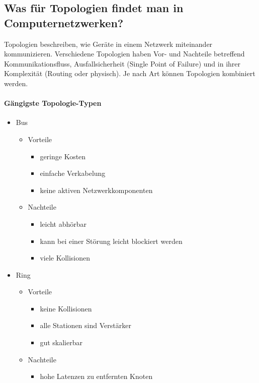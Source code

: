 \subsection*{Was für Topologien findet man in Computernetzwerken?}\label{sub:Topologies}
Topologien beschreiben, wie Geräte in einem Netzwerk miteinander kommunizieren. Verschiedene Topologien haben Vor- und Nachteile betreffend Kommunikationsfluss, Ausfallsicherheit (Single Point of Failure) und in ihrer Komplexität (Routing oder physisch). Je nach Art können Topologien kombiniert werden.

\paragraph*{Gängigste Topologie-Typen}
\begin{itemize}
    \item Bus
    \begin{itemize}
        \item Vorteile
        \begin{itemize}
            \item geringe Kosten
            \item einfache Verkabelung
            \item keine aktiven Netzwerkkomponenten
        \end{itemize}
        \item Nachteile
        \begin{itemize}
            \item leicht abhörbar
            \item kann bei einer Störung leicht blockiert werden
            \item viele Kollisionen
        \end{itemize}
    \end{itemize}
    \item Ring
    \begin{itemize}
        \item Vorteile
        \begin{itemize}
            \item keine Kollisionen
            \item alle Stationen sind Verstärker
            \item gut skalierbar
        \end{itemize}
        \item Nachteile
        \begin{itemize}
            \item hohe Latenzen zu entfernten Knoten

\end{itemize}
\end{itemize}
\end{itemize}
